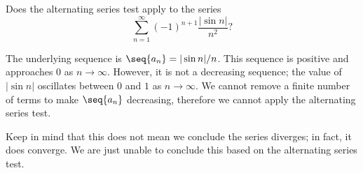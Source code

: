 \documentclass{ximera}
\begin{document}
    \begin{question}
      Does the alternating series test apply to the series
      \[
      \sum_{n=1}^\infty (-1)^{n+1}\frac{|\sin n|}{n^2}?
      \]
      \begin{prompt}
        \begin{multipleChoice}
        \end{multipleChoice}
        \begin{feedback}
          The underlying sequence is $\seq{a_n} = |\sin n|/n$. This
          sequence is positive and approaches $0$ as
          $n\to\infty$. However, it is not a decreasing sequence; the
          value of $|\sin n|$ oscillates between $0$ and $1$ as
          $n\to\infty$. We cannot remove a finite number of terms to
          make $\seq{a_n}$ decreasing, therefore we cannot apply the
          alternating series test.
	  
          Keep in mind that this does not mean we conclude the series
          diverges; in fact, it does converge. We are just unable to
          conclude this based on the alternating series test.
        \end{feedback}
      \end{prompt}
    \end{question}
\end{document}
